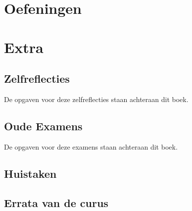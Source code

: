 \documentclass[a4paper,10pt,oneside]{book}
\begin{document}
\part{Oefeningen}







\part{Extra}





\chapter{Zelfreflecties}
De opgaven voor deze zelfreflecties staan achteraan dit boek.







\chapter{Oude Examens}
De opgaven voor deze examens staan achteraan dit boek.






\chapter{Huistaken}



\appendix
\chapter{Errata van de curus}

\end{document}
